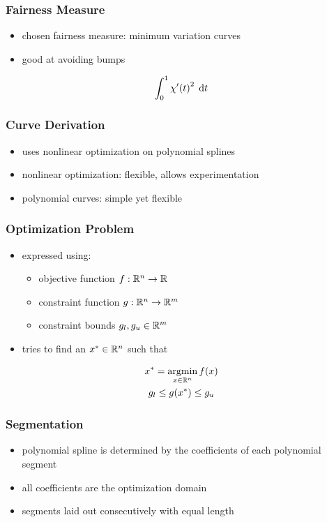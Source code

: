 \documentclass{beamer}
\begin{document}
		\begin{frame}
			\frametitle{Fairness Measure}
			\begin{itemize}
				\item chosen fairness measure: minimum variation curves
				\item good at avoiding bumps
			\end{itemize}
			 \begin{equation*}
				 \int_{0}^{1} \chi'\!\left( t \right)^2 \; \mathrm{d}t
			 \end{equation*}
		\end{frame}
		
		\begin{frame}
			\frametitle{Curve Derivation}
			\begin{itemize}
				\item uses nonlinear optimization on polynomial splines %
				\item nonlinear optimization: flexible, allows experimentation
				\item polynomial curves: simple yet flexible %
			\end{itemize}
		\end{frame}
		
		\begin{frame}
			\frametitle{Optimization Problem}
			\begin{itemize}
				\item expressed using:
				\begin{itemize}
					\item objective function \(f : \mathbb{R}^{n} \rightarrow \mathbb{R}\)
					\item constraint function \(g : \mathbb{R}^{n} \rightarrow \mathbb{R}^{m}\)
					\item constraint bounds \(g_l, g_u \in \mathbb{R}^{m}\)
				\end{itemize} 
				\item tries to find an \(x^* \in \mathbb{R}^{n}\) such that 
			\end{itemize}
			\begin{equation*}
				\begin{gathered}
					x^* = \operatorname*{argmin}_{x \in \mathbb{R}^{n}} f\!\left( x \right)\\
					g_l \leq g\!\left( x^* \right) \leq g_u
				\end{gathered}
			\end{equation*}
		\end{frame}
		
		
		\begin{frame}
			\frametitle{Segmentation}
			\begin{itemize}
				\item polynomial spline is determined by the coefficients of each polynomial segment
				\item all coefficients are the optimization domain
				\item segments laid out consecutively with equal length
			\end{itemize}
		\end{frame}
\end{document}
